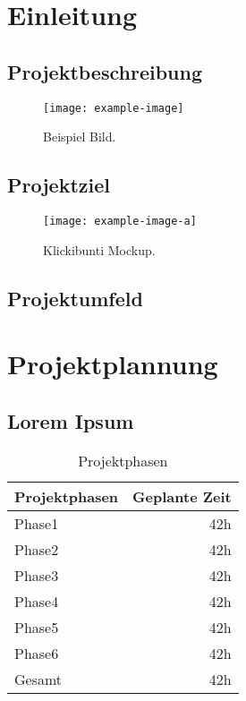 \documentclass[12pt, a4paper]{article}
\begin{document}
\section{Einleitung}
    \subsection{Projektbeschreibung}
    \begin{figure}[ht]
        \centering
        \texttt{[image: example-image]}
        \caption[Beispiel Bild]{Beispiel Bild\footnotemark.}
    \end{figure}
    \lipsum[1]
    \subsection{Projektziel}
    \lipsum[1-2]
    \begin{wrapfigure}{l}{.3\textwidth}
        \centering
        \texttt{[image: example-image-a]}
        \caption[Klickibunti Mockup]{Klickibunti Mockup\footnotemark.}
    \end{wrapfigure}
    \lipsum[2-3]
    \subsection{Projektumfeld}
    \lipsum[1]

\newpage
\section{Projektplannung}
    \subsection{Lorem Ipsum}
    \lipsum[1]
    \begin{table}[!htb]
        \centering
        \caption{Projektphasen}
        \begin{tabular}{|lr|}
            \hline
            \textbf{Projektphasen} & \textbf{Geplante Zeit} \\
            \hline
            Phase1 & 42h \\
            Phase2 & 42h \\
            Phase3 & 42h \\
            Phase4 & 42h \\
            Phase5 & 42h \\
            Phase6 & 42h \\
            \hline
            Gesamt & 42h \\
            \hline
        \end{tabular}
    \end{table}
\end{document}
